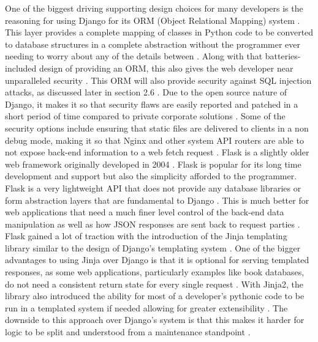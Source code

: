 One of the biggest driving supporting design choices for many developers is the reasoning for using Django for its ORM (Object Relational Mapping) system \cite{Khatri_Johns_2023}. This layer provides a complete mapping of classes in Python code to be converted to database structures in a complete abstraction without the programmer ever needing to worry about any of the details between \cite{Chou_Chen_Ding_Tu_Xu_2013}. Along with that batteries-included design of providing an ORM, this also gives the web developer near unparalleled security \cite{Chou_Chen_Ding_Tu_Xu_2013}. This ORM will also provide security against SQL injection attacks, as discussed later in section 2.6 \cite{Li_Manoharan_2013, Chen_Tang_Wang_Zhao_Guo_2016}. Due to the open source nature of Django, it makes it so that security flaws are easily reported and patched in a short period of time compared to private corporate solutions \cite{Chou_Chen_Ding_Tu_Xu_2013}. Some of the security options include ensuring that static files are delivered to clients in a non debug mode, making it so that Nginx and other system API routers are able to not expose back-end information to a web fetch request \cite{Khatri_Johns_2023}.
\newline
\newline
Flask is a slightly older web framework originally developed in 2004 \cite{Ravindran_2018}. Flask is popular for its long time development and support but also the simplicity afforded to the programmer. Flask is a very lightweight API that does not provide any database libraries or form abstraction layers that are fundamental to Django \cite{Dugar_2018, Ravindran_2018}. This is much better for web applications that need a much finer level control of the back-end data manipulation as well as how JSON responses are sent back to request parties \cite{Dugar_2018}.
\newline
\newline
Flask gained a lot of traction with the introduction of the Jinja templating library similar to the design of Django’s templating system \cite{Dugar_2018, Ravindran_2018}. One of the bigger advantages to using Jinja over Django is that it is optional for serving templated responses, as some web applications, particularly examples like book databases, do not need a consistent return state for every single request \cite{Dugar_2018}. With Jinja2, the library also introduced the ability for most of a developer's pythonic code to be run in a templated system if needed allowing for greater extensibility \cite{Dugar_2018}. The downside to this approach over Django’s system is that this makes it harder for logic to be split and understood from a maintenance standpoint \cite{Dugar_2018}.
